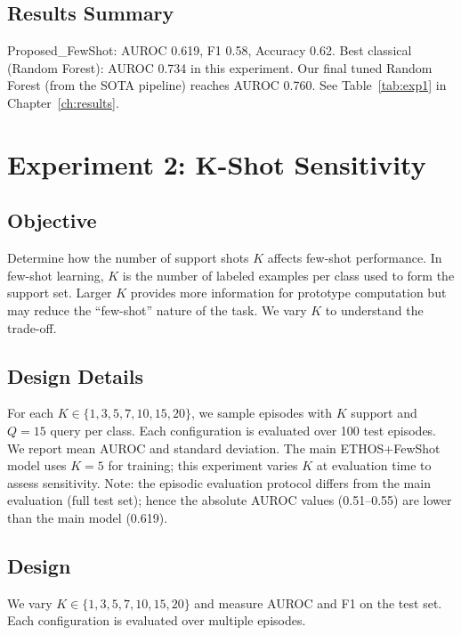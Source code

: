 \subsection{Results Summary}

Proposed\_FewShot: AUROC 0.619, F1 0.58, Accuracy 0.62. Best classical (Random Forest): AUROC 0.734 in this experiment. Our final tuned Random Forest (from the SOTA pipeline) reaches AUROC 0.760. See Table~\ref{tab:exp1} in Chapter~\ref{ch:results}.

\section{Experiment 2: K-Shot Sensitivity}

\subsection{Objective}

Determine how the number of support shots $K$ affects few-shot performance. In few-shot learning, $K$ is the number of labeled examples per class used to form the support set. Larger $K$ provides more information for prototype computation but may reduce the ``few-shot'' nature of the task. We vary $K$ to understand the trade-off.

\subsection{Design Details}

For each $K \in \{1, 3, 5, 7, 10, 15, 20\}$, we sample episodes with $K$ support and $Q=15$ query per class. Each configuration is evaluated over 100 test episodes. We report mean AUROC and standard deviation. The main ETHOS+FewShot model uses $K=5$ for training; this experiment varies $K$ at evaluation time to assess sensitivity. Note: the episodic evaluation protocol differs from the main evaluation (full test set); hence the absolute AUROC values (0.51--0.55) are lower than the main model (0.619).

\subsection{Design}

We vary $K \in \{1, 3, 5, 7, 10, 15, 20\}$ and measure AUROC and F1 on the test set. Each configuration is evaluated over multiple episodes.

